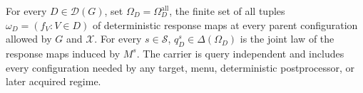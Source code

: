 For every \(D\in\mathcal D(G)\), set \(\Omega_D=\Omega_D^{\mathrm{all}}\), the finite set of all tuples \(\omega_D=(f_V:V\in D)\) of deterministic response maps at every parent configuration allowed by \(G\) and \(\mathcal X\).  For every \(s\in\mathcal S\), \(q_D^s\in\Delta(\Omega_D)\) is the joint law of the response maps induced by \(M^s\).  The carrier is query independent and includes every configuration needed by any target, menu, deterministic postprocessor, or later acquired regime.